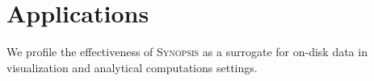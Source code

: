 \section{Applications}
\label{sec:applications}
We profile the effectiveness of \textsc{Synopsis} as a surrogate for on-disk data in visualization and analytical computations settings.



